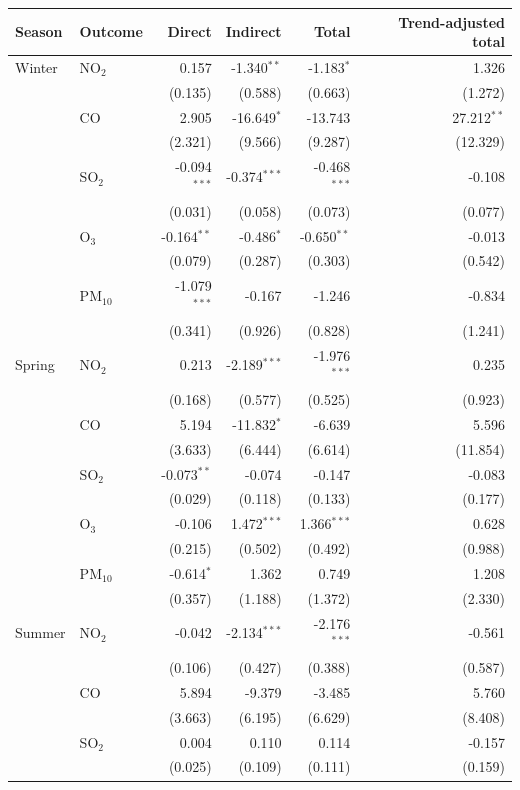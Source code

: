 \begin{tabular}{llrrrr}
\toprule
Season & Outcome & Direct & Indirect & Total & Trend-adjusted total \\
\midrule
Winter & NO$_2$ & 0.157 & -1.340$^{**}$ & -1.183$^{*}$ & 1.326 \\
 &  & (0.135) & (0.588) & (0.663) & (1.272) \\
 & CO & 2.905 & -16.649$^{*}$ & -13.743 & 27.212$^{**}$ \\
 &  & (2.321) & (9.566) & (9.287) & (12.329) \\
 & SO$_2$ & -0.094$^{***}$ & -0.374$^{***}$ & -0.468$^{***}$ & -0.108 \\
 &  & (0.031) & (0.058) & (0.073) & (0.077) \\
 & O$_3$ & -0.164$^{**}$ & -0.486$^{*}$ & -0.650$^{**}$ & -0.013 \\
 &  & (0.079) & (0.287) & (0.303) & (0.542) \\
 & PM$_{10}$ & -1.079$^{***}$ & -0.167 & -1.246 & -0.834 \\
 &  & (0.341) & (0.926) & (0.828) & (1.241) \\
\addlinespace[4pt]
Spring & NO$_2$ & 0.213 & -2.189$^{***}$ & -1.976$^{***}$ & 0.235 \\
 &  & (0.168) & (0.577) & (0.525) & (0.923) \\
 & CO & 5.194 & -11.832$^{*}$ & -6.639 & 5.596 \\
 &  & (3.633) & (6.444) & (6.614) & (11.854) \\
 & SO$_2$ & -0.073$^{**}$ & -0.074 & -0.147 & -0.083 \\
 &  & (0.029) & (0.118) & (0.133) & (0.177) \\
 & O$_3$ & -0.106 & 1.472$^{***}$ & 1.366$^{***}$ & 0.628 \\
 &  & (0.215) & (0.502) & (0.492) & (0.988) \\
 & PM$_{10}$ & -0.614$^{*}$ & 1.362 & 0.749 & 1.208 \\
 &  & (0.357) & (1.188) & (1.372) & (2.330) \\
\addlinespace[4pt]
Summer & NO$_2$ & -0.042 & -2.134$^{***}$ & -2.176$^{***}$ & -0.561 \\
 &  & (0.106) & (0.427) & (0.388) & (0.587) \\
 & CO & 5.894 & -9.379 & -3.485 & 5.760 \\
 &  & (3.663) & (6.195) & (6.629) & (8.408) \\
 & SO$_2$ & 0.004 & 0.110 & 0.114 & -0.157 \\
 &  & (0.025) & (0.109) & (0.111) & (0.159) \\

\end{tabular}
